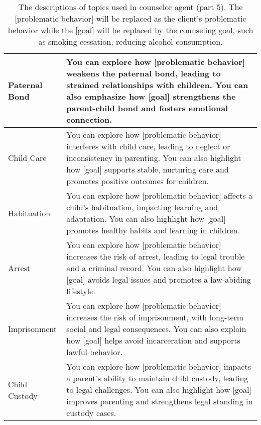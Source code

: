 \begin{table*}[tb]
\begin{tabularx}{\textwidth}{lX}
Paternal Bond               & You can explore how [problematic behavior] weakens the paternal bond, leading to strained relationships with children. You can also emphasize how [goal] strengthens the parent-child bond and fosters emotional connection.                                                                                                                                                                                                       \\ \hline
Child Care                  & You can explore how [problematic behavior] interferes with child care, leading to neglect or inconsistency in parenting. You can also highlight how [goal] supports stable, nurturing care and promotes positive outcomes for children.                                                                                                                                                                                            \\ \hline
Habituation                 & You can explore how [problematic behavior] affects a child’s habituation, impacting learning and adaptation. You can also highlight how [goal] promotes healthy habits and learning in children.                                                                                                                                                                                                                                   \\ \hline
Arrest                      & You can explore how [problematic behavior] increases the risk of arrest, leading to legal trouble and a criminal record. You can also highlight how [goal] avoids legal issues and promotes a law-abiding lifestyle.                                                                                                                                                                                                               \\ \hline
Imprisonment                & You can explore how [problematic behavior] increases the risk of imprisonment, with long-term social and legal consequences. You can also explain how [goal] helps avoid incarceration and supports lawful behavior.                                                                                                                                                                                                               \\ \hline
Child Custody               & You can explore how [problematic behavior] impacts a parent’s ability to maintain child custody, leading to legal challenges. You can also highlight how [goal] improves parenting and strengthens legal standing in custody cases.
\\ \bottomrule
\end{tabularx}
\caption{The descriptions of topics used in counselor agent (part 5). The [problematic behavior] will be replaced as the client's problematic behavior while the [goal] will be replaced by the counseling goal, such as smoking cessation, reducing alcohol consumption.}
\label{tab:counselor topic description 5}
\end{table*}   

